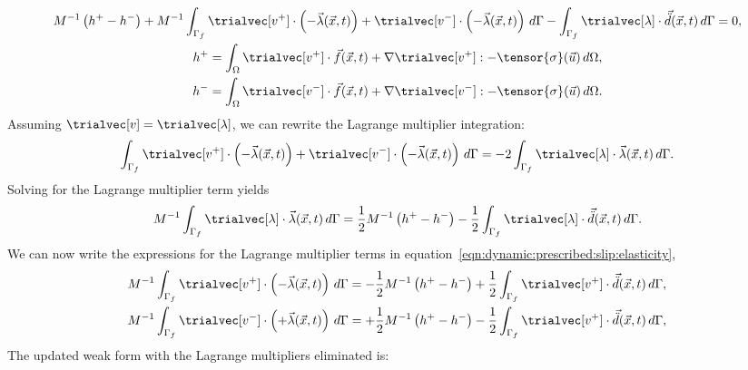 \begin{gather}
M^{-1} \left( h^+ - h^- \right) + M^{-1} \int_{\Gamma_{f}} \trialvec[v^+] \cdot \left(-\vec{\lambda}(\vec{x},t)\right)
  + \trialvec[v^-] \cdot \left(-\vec{\lambda}(\vec{x},t)\right)\, d\Gamma - \int_{\Gamma_f} \trialvec[\lambda] \cdot \vec{\ddot{d}}(\vec{x},t) \, d\Gamma = 0, \\
  h^+ = \int_{\Omega} \trialvec[v^+] \cdot \vec{f}(\vec{x},t) + \nabla \trialvec[v^+] : -\tensor{\sigma}(\vec{u}) \, d\Omega, \\
  h^- = \int_{\Omega} \trialvec[v^-] \cdot \vec{f}(\vec{x},t) + \nabla \trialvec[v^-] : -\tensor{\sigma}(\vec{u}) \, d\Omega.
\end{gather}
Assuming $\trialvec[v] = \trialvec[\lambda]$, we can rewrite the Lagrange multiplier integration:
\begin{equation}
  \int_{\Gamma_{f}} \trialvec[v^+] \cdot \left(-\vec{\lambda}(\vec{x},t)\right)
    + \trialvec[v^-] \cdot \left(-\vec{\lambda}(\vec{x},t)\right)\, d\Gamma =
    -2 \int_{\Gamma_f} \trialvec[\lambda] \cdot \vec{\lambda}(\vec{x},t) \, d\Gamma.
\end{equation}
Solving for the Lagrange multiplier term yields
\begin{equation}
  M^{-1} \int_{\Gamma_f} \trialvec[\lambda] \cdot \vec{\lambda}(\vec{x},t) \, d\Gamma =
  \frac{1}{2} M^{-1} \left( h^+ - h^- \right)
  -\frac{1}{2} \int_{\Gamma_f} \trialvec[\lambda] \cdot \vec{\ddot{d}}(\vec{x},t) \, d\Gamma.
\end{equation}
We can now write the expressions for the Lagrange multiplier terms in
equation~\ref{eqn:dynamic:prescribed:slip:elasticity},
\begin{gather}
  M^{-1} \int_{\Gamma_f} \trialvec[v^+] \cdot \left(-\vec{\lambda}(\vec{x},t)\right) \, d\Gamma =
-\frac{1}{2} M^{-1} \left( h^+ - h^- \right) +\frac{1}{2} \int_{\Gamma_f} \trialvec[v^+] \cdot \vec{\ddot{d}}(\vec{x},t) \, d\Gamma, \\ 
  M^{-1} \int_{\Gamma_f} \trialvec[v^-] \cdot \left(+\vec{\lambda}(\vec{x},t)\right) \, d\Gamma =
+\frac{1}{2} M^{-1} \left( h^+ - h^- \right) -\frac{1}{2} \int_{\Gamma_f} \trialvec[v^+] \cdot \vec{\ddot{d}}(\vec{x},t) \, d\Gamma, \\ 
\end{gather}
The updated weak form with the Lagrange multipliers eliminated is:
